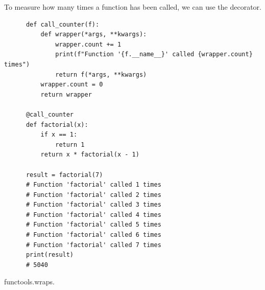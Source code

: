   \begin{example}
    \label{ex:measuring-function-call-count}
    To measure how many times a function has been called, we can use the decorator. 
    \begin{lstlisting}
      def call_counter(f):
          def wrapper(*args, **kwargs):
              wrapper.count += 1
              print(f"Function '{f.__name__}' called {wrapper.count} times")
              return f(*args, **kwargs)
          wrapper.count = 0
          return wrapper

      @call_counter
      def factorial(x): 
          if x == 1: 
              return 1 
          return x * factorial(x - 1)

      result = factorial(7)
      # Function 'factorial' called 1 times
      # Function 'factorial' called 2 times
      # Function 'factorial' called 3 times
      # Function 'factorial' called 4 times
      # Function 'factorial' called 5 times
      # Function 'factorial' called 6 times
      # Function 'factorial' called 7 times
      print(result)       
      # 5040
    \end{lstlisting}
  \end{example}

  functools.wraps. 

